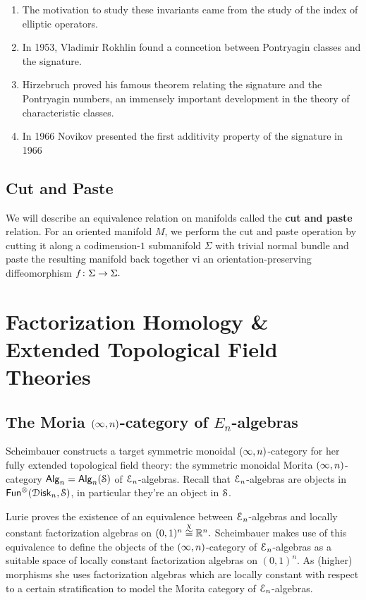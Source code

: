 \begin{enumerate}
    \item The motivation to study these invariants came from the study of the index of elliptic operators.
    \item In 1953, Vladimir Rokhlin found a conncetion between Pontryagin classes and the signature.
    \item Hirzebruch proved his famous theorem relating the signature and the Pontryagin numbers, an immensely important development in the theory of characteristic classes.
    \item In 1966 Novikov presented the first additivity property of the signature in 1966
\end{enumerate}
\subsection{Cut and Paste}
\begin{motivation}
We will describe an equivalence relation on manifolds called the \textbf{cut and paste} relation. For an oriented manifold $M$, we perform the cut and paste operation by cutting it along a codimension-$1$ submanifold $\Sigma$ with trivial normal bundle and paste the resulting manifold back together vi an orientation-preserving diffeomorphism $f\colon \Sigma \rightarrow \Sigma.$ 
\end{motivation}

\section{Factorization Homology \& Extended Topological Field Theories}


\subsection{The Moria $(\operatorname{\infty},n)$-category of $E_n$-algebras}
Scheimbauer constructs a target symmetric monoidal $(\operatorname{\infty},n)$-category for her fully extended topological field theory: the symmetric monoidal Morita $(\operatorname{\infty},n)$-category $\operatorname{\sf Alg}_n=\operatorname{\sf Alg}_n(\mathcal S)$ of $\mathcal E_n$-algebras. Recall that $\mathcal E_n$-algebras are objects in $\operatorname{{\sf Fun}}^\otimes(\operatorname{\mathcal D{\mathsf{isk}}}_n,\mathcal S)$, in particular they're an object in $\mathcal S$.

Lurie proves the existence of an equivalence between $\mathcal E_n$-algebras and locally constant factorization algebras on $(0,1)^n\overset{\chi}{\cong} \mathbb R^n.$ Scheimbauer makes use of this equivalence to define the objects of the $(\operatorname{\infty},n)$-category of $\mathcal E_n$-algebras as a suitable space of locally constant factorization algebras on $(0,1)^n.$ As (higher) morphisms she uses factorization algebras which are locally constant with respect to a certain stratification to model the Morita category of $\mathcal E_n$-algebras. 

